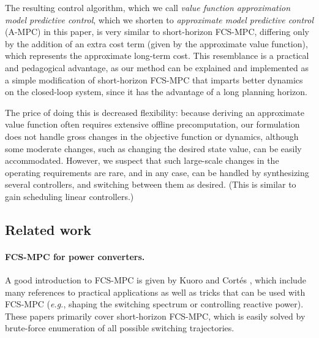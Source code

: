 \documentclass[12pt]{article}
\newcommand{\eg}{{\it e.g.}}
\begin{document}
The resulting control algorithm, which we call 
\emph{value function approximation model predictive control}, 
which we shorten to \emph{approximate model predictive control} (A-MPC)
in this paper,
is very similar to short-horizon FCS-MPC,
differing only by the addition of an extra cost term 
(given by the approximate value function),
which represents the approximate long-term cost.
This resemblance is a practical and pedagogical advantage,
as our method can be explained and implemented as a simple modification
of short-horizon FCS-MPC
that imparts better dynamics on the closed-loop system,
since it has the advantage of a long planning horizon.

The price of doing this is decreased flexibility:
because deriving an approximate value function often 
requires extensive offline precomputation,
our formulation does not handle gross
changes in the objective function or dynamics,
although some moderate changes, such as changing the desired state value,
can be easily accommodated.
However, we suspect that such large-scale changes in the 
operating requirements are rare,
and in any case, can be handled by synthesizing several controllers,
and switching between them as desired.
(This is similar to gain scheduling linear controllers.)




\subsection{Related work}

\paragraph{FCS-MPC for power converters.}
A good introduction to FCS-MPC
is given by Kuoro \cite{kouro2009model}
and Cort\'{e}s \cite{cortes2008predictive},
which include many references to practical applications
as well as tricks that can be used with FCS-MPC
(\eg, shaping the switching spectrum
or controlling reactive power).
These papers primarily cover short-horizon FCS-MPC,
which is easily solved by brute-force enumeration of all possible switching trajectories.
\end{document}
